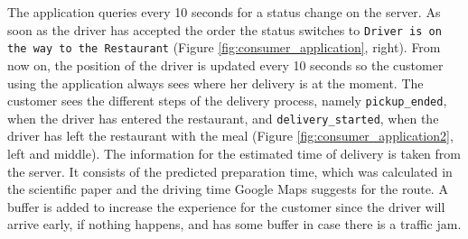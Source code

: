 The application queries every 10 seconds for a status change on the server. As soon as the driver has accepted the order the status switches to \texttt{Driver is on the way to the Restaurant} (Figure \ref{fig:consumer_application}, right). From now on, the position of the driver is updated every 10 seconds so the customer using the application always sees where her delivery is at the moment. The customer sees the different steps of the delivery process, namely \texttt{pickup\_ended}, when the driver has entered the restaurant, and \texttt{delivery\_started}, when the driver has left the restaurant with the meal (Figure \ref{fig:consumer_application2}, left and middle). The information for the estimated time of delivery is taken from the server. It consists of the predicted preparation time, which was calculated in the scientific paper and the driving time Google Maps suggests for the route. A buffer is added to increase the experience for the customer since the driver will arrive early, if nothing happens, and has some buffer in case there is a traffic jam.
